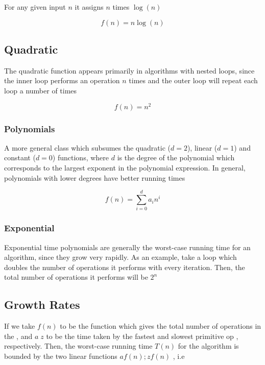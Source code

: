 	\par{For any given input $n$ it assigns $n$ times $\log(n)$}

	$$f(n) = n\log(n)$$

\subsection{Quadratic}

	\par{The quadratic function appears primarily in algorithms with nested
			loops, since the inner loop performs an operation $n$ times and the
	outer loop will repeat each loop a  number of times}

	$$f(n) = n^2$$

\subsubsection{Polynomials}

\par{A more general class which subsumes the quadratic ($d=2$), linear ($d=1$)
		and constant ($d=0$) functions, where $d$ is the degree of the
		polynomial which corresponds to the largest exponent in the polynomial
		expression. In general, polynomials with lower degrees have better
running times}

$$f(n) = \sum_{i=0}^{d} a_{i}n^{i}$$

\subsubsection{Exponential}

	\par{Exponential time polynomials are generally the worst-case running time
			for an algorithm, since they grow very rapidly. As an example, take
			a loop which doubles the number of operations it performs with every
			iteration. Then, the total number of operations it performs will be
	$2^n$}


\subsection{Growth Rates}


	\par{If we take $f(n)$ to be the function which gives the total number of
			operations in the , and $a\;z$ to be the time taken
			by the fastest and slowest primitive op , respectively. Then, the
			worst-case running time $T(n)$ for the algorithm is bounded by the two
	linear functions $af(n);zf(n)$ , i.e}

